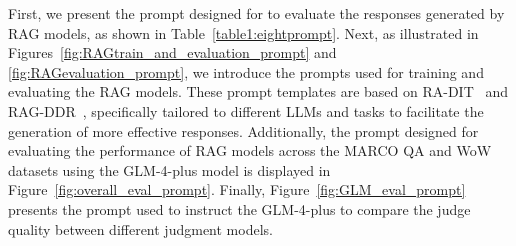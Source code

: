 First, we present the prompt designed for \method{} to evaluate the responses generated by RAG models, as shown in Table~\ref{table1:eightprompt}. Next, as illustrated in Figures~\ref{fig:RAGtrain_and_evaluation_prompt} and \ref{fig:RAGevaluation_prompt}, we introduce the prompts used for training and evaluating the RAG models. These prompt templates are based on RA-DIT~\cite{Radit2023Lin} and RAG-DDR~\cite{rag-ddr2024Li}, specifically tailored to different LLMs and tasks to facilitate the generation of more effective responses. Additionally, the prompt designed for evaluating the performance of RAG models across the MARCO QA and WoW datasets using the GLM-4-plus model is displayed in Figure~\ref{fig:overall_eval_prompt}. Finally, Figure~\ref{fig:GLM_eval_prompt} presents the prompt used to instruct the GLM-4-plus to compare the judge quality between different judgment models.
































